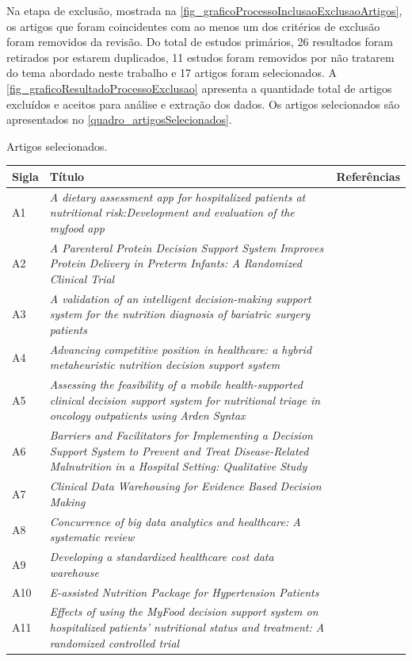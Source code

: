 Na etapa de exclusão, mostrada na \autoref{fig_graficoProcessoInclusaoExclusaoArtigos}, os artigos que foram coincidentes com ao menos um dos critérios de exclusão foram removidos da revisão. Do total de estudos primários, 26 resultados foram retirados por estarem duplicados, 11 estudos foram removidos por não tratarem do tema abordado neste trabalho e 17 artigos foram selecionados. A \autoref{fig_graficoResultadoProcessoExclusao} apresenta a quantidade total de artigos excluídos e aceitos para análise e extração dos dados. Os artigos selecionados são apresentados no \autoref{quadro_artigosSelecionados}.

\begin{quadro}[htb]
\caption{\label{quadro_artigosSelecionados}Artigos selecionados.}
\begin{tabular}{|p{1cm}|p{8cm}|p{5cm}|}
	\hline
	\textbf{Sigla} & \textbf{Título} & \textbf{Referências} \\ \hline
	A1  & \textit{A dietary assessment app for hospitalized patients at nutritional risk:Development and evaluation of the myfood app} & \cite{paulsen2018_1} \\ \hline
	A2  & \textit{A Parenteral Protein Decision Support System Improves Protein Delivery in Preterm Infants: A Randomized Clinical Trial} & \cite{alrifai2017} \\ \hline
	A3  & \textit{A validation of an intelligent decision-making support system for the nutrition diagnosis of bariatric surgery patients} & \cite{cruz2017} \\ \hline
	A4  & \textit{Advancing competitive position in healthcare: a hybrid metaheuristic nutrition decision support system} & \cite{ileri2019} \\ \hline
	A5  & \textit{Assessing the feasibility of a mobile health-supported clinical decision support system for nutritional triage in oncology outpatients using Arden Syntax} & \cite{bruin2018} \\ \hline
	A6  & \textit{Barriers and Facilitators for Implementing a Decision Support System to Prevent and Treat Disease-Related Malnutrition in a Hospital Setting: Qualitative Study} & \cite{paulsen2018_2} \\ \hline
	A7  & \textit{Clinical Data Warehousing for Evidence Based Decision Making} & \cite{narra2015} \\ \hline
	A8  & \textit{Concurrence of big data analytics and healthcare: A systematic review} & \cite{metha2018} \\ \hline
	A9  & \textit{Developing a standardized healthcare cost data warehouse} & \cite{visscher2017} \\ \hline
	A10  & \textit{E-assisted Nutrition Package for Hypertension Patients} & \cite{boonapai2016} \\ \hline
	A11 & \textit{Effects of using the MyFood decision support system on hospitalized patients' nutritional status and treatment: A randomized controlled trial} & \cite{paulsen2020} \\ \hline
\end{tabular}
\end{quadro} 
